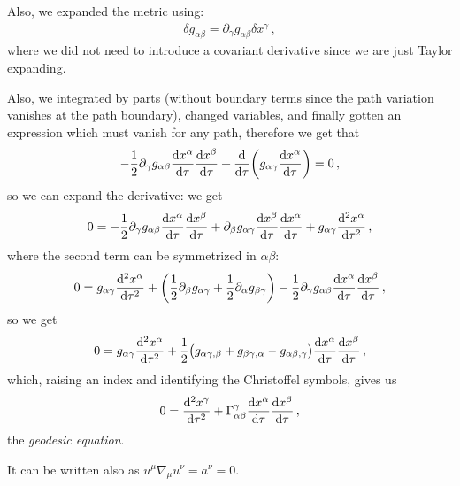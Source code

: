 \documentclass[main.tex]{subfiles}
\begin{document}
Also, we expanded the metric using: 
%
\begin{align}
  \delta g_{\alpha \beta } = \partial_{\gamma } g_{ \alpha \beta } \delta x^{\gamma }
\,,
\end{align}
%
where we did not need to introduce a covariant derivative since we are just Taylor expanding.

Also, we integrated by parts (without boundary terms since the path variation vanishes at the path boundary), changed variables, and finally gotten an expression which must vanish for any path, therefore we get that 
%
\begin{align}
    -\frac{1}{2} \partial_{\gamma }g_{\alpha \beta } \dv{x^{\alpha }}{\tau } \dv{x^{\beta }}{\tau } 
    + \dv{}{\tau } \qty(g_{\alpha \gamma } \dv{x^{\alpha }}{\tau }) = 0
\,,
\end{align}
%
so we can expand the derivative: we get 
%
\begin{align}
  0= - \frac{1}{2} \partial_{\gamma }g_{\alpha \beta } \dv{x^{\alpha }}{\tau } \dv{x^{\beta }}{\tau } + 
  \partial_{\beta }g_{\alpha \gamma } \dv{x^{\beta }}{\tau } \dv{x^{\alpha }}{\tau } + g_{\alpha \gamma } \dv[2]{x^{\alpha }}{\tau }
\,,
\end{align}
%
where the second term can be symmetrized in \(\alpha \beta \): 
%
\begin{align}
  0= g_{\alpha \gamma } \dv[2]{x^{\alpha }}{\tau } +
  \qty(\frac{1}{2} \partial_{\beta }g_{\alpha \gamma } + \frac{1}{2}\partial_{\alpha } g_{\beta \gamma }) - \frac{1}{2}\partial_{\gamma }g_{\alpha \beta } \dv{x^{\alpha }}{\tau } \dv{x^{\beta }}{\tau }
\,,
\end{align}
%
so we get 
%
\begin{align}
  0= g_{\alpha \gamma } \dv[2]{x^{\alpha }}{\tau } +
  \frac{1}{2}\qty(g_{\alpha \gamma , \beta } + g_{\beta \gamma , \alpha } - g_{\alpha \beta , \gamma })
  \dv{x^{\alpha }}{\tau } \dv{x^{\beta }}{\tau }
\,,
\end{align}
%
which, raising an index and identifying the Christoffel symbols, gives us 
%
\begin{align}
  0 = \dv[2]{x^{\gamma }}{\tau } + \Gamma^{\gamma }_{\alpha \beta } \dv{x^{\alpha }}{\tau } \dv{x^{\beta }}{\tau }
\,,
\end{align}
%
the \emph{geodesic equation}.

It can be written also as \(u^{\mu } \nabla_{\mu }u^{\nu } = a^{\nu } = 0\).
\end{document}
